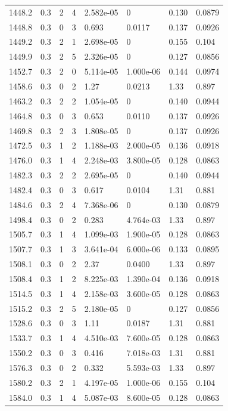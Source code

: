 \documentclass[preview]{standalone}
\begin{document}
{{{{{\begin{tabular}{L{1.2cm}C{1.2cm} C{0.3cm}C{0.5cm} C{1.4cm}C{1.4cm} C{1.4cm}C{1.4cm}}
  1448.2  &   0.3  & 2     &  4 &  2.582e-05  & 0  & 0.130 &  0.0879   \\ 
  1448.8  &   0.3  & 0     &  3 &  0.693  & 0.0117  & 0.137 &  0.0926   \\ 
  1449.2  &   0.3  & 2     &  1 &  2.698e-05  & 0  & 0.155 &  0.104   \\ 
  1449.9  &   0.3  & 2     &  5 &  2.326e-05  & 0  & 0.127 &  0.0856   \\ 
  1452.7  &   0.3  & 2     &  0 &  5.114e-05  & 1.000e-06  & 0.144 &  0.0974   \\ 
  1458.6  &   0.3  & 0     &  2 &  1.27  & 0.0213  & 1.33 &  0.897   \\ 
  1463.2  &   0.3  & 2     &  2 &  1.054e-05  & 0  & 0.140 &  0.0944   \\ 
  1464.8  &   0.3  & 0     &  3 &  0.653  & 0.0110  & 0.137 &  0.0926   \\ 
  1469.8  &   0.3  & 2     &  3 &  1.808e-05  & 0  & 0.137 &  0.0926   \\ 
  1472.5  &   0.3  & 1     &  2 &  1.188e-03  & 2.000e-05  & 0.136 &  0.0918   \\ 
  1476.0  &   0.3  & 1     &  4 &  2.248e-03  & 3.800e-05  & 0.128 &  0.0863   \\ 
  1482.3  &   0.3  & 2     &  2 &  2.695e-05  & 0  & 0.140 &  0.0944   \\ 
  1482.4  &   0.3  & 0     &  3 &  0.617  & 0.0104  & 1.31 &  0.881   \\ 
  1484.6  &   0.3  & 2     &  4 &  7.368e-06  & 0  & 0.130 &  0.0879   \\ 
  1498.4  &   0.3  & 0     &  2 &  0.283  & 4.764e-03  & 1.33 &  0.897   \\ 
  1505.7  &   0.3  & 1     &  4 &  1.099e-03  & 1.900e-05  & 0.128 &  0.0863   \\ 
  1507.7  &   0.3  & 1     &  3 &  3.641e-04  & 6.000e-06  & 0.133 &  0.0895   \\ 
  1508.1  &   0.3  & 0     &  2 &  2.37  & 0.0400  & 1.33 &  0.897   \\ 
  1508.4  &   0.3  & 1     &  2 &  8.225e-03  & 1.390e-04  & 0.136 &  0.0918   \\ 
  1514.5  &   0.3  & 1     &  4 &  2.158e-03  & 3.600e-05  & 0.128 &  0.0863   \\ 
  1515.2  &   0.3  & 2     &  5 &  2.180e-05  & 0  & 0.127 &  0.0856   \\ 
  1528.6  &   0.3  & 0     &  3 &  1.11  & 0.0187  & 1.31 &  0.881   \\ 
  1533.7  &   0.3  & 1     &  4 &  4.510e-03  & 7.600e-05  & 0.128 &  0.0863   \\ 
  1550.2  &   0.3  & 0     &  3 &  0.416  & 7.018e-03  & 1.31 &  0.881   \\ 
  1576.3  &   0.3  & 0     &  2 &  0.332  & 5.593e-03  & 1.33 &  0.897   \\ 
  1580.2  &   0.3  & 2     &  1 &  4.197e-05  & 1.000e-06  & 0.155 &  0.104   \\ 
  1584.0  &   0.3  & 1     &  4 &  5.087e-03  & 8.600e-05  & 0.128 &  0.0863   \\ 
\hline 
\end{tabular} 

}}}}}
\end{document}
